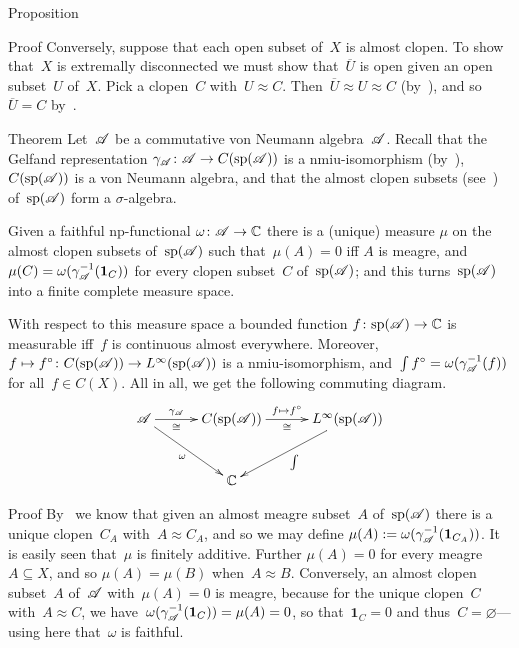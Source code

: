 \documentclass[a]{subfiles}
\begin{document}
\begin{parsec}
\begin{point}{Proposition}
\begin{point}{Proof}
Conversely,
suppose that each open subset of~$X$ is almost clopen.
To show that~$X$ is extremally disconnected
we must show that~$\overline{U}$ is open given
an open subset~$U$ of~$X$.
Pick a clopen~$C$ with~$U\approx C$.
Then~$\overline{U}\approx U\approx C$
(by~),
and so~$\overline{U}=C$ by~.


\end{point}
\end{point}
\begin{point}{Theorem}%
Let~$\mathscr{A}$ be a commutative von Neumann algebra~$\mathscr{A}$.
Recall that
the Gelfand representation $\gamma_{\mathscr{A}}\colon 
\mathscr{A}\to C(\mathrm{sp}(\mathscr{A}))$
is a nmiu-isomorphism (by~),
$C(\mathrm{sp}(\mathscr{A}))$ is a von Neumann algebra,
and that the almost clopen subsets (see~) of~$\mathrm{sp}(\mathscr{A})$
form a $\sigma$-algebra.

Given a faithful np-functional $\omega\colon \mathscr{A}\to\mathbb{C}$
there is a (unique) measure
$\mu$ on the almost clopen subsets of~$\mathrm{sp}(\mathscr{A})$
such that~$\mu(A)=0$ iff $A$ is meagre,
and~$\mu(C)=\omega(\gamma_{\mathscr{A}}^{-1} (\mathbf{1}_{C}))$
for every clopen subset~$C$ of~$\mathrm{sp}(\mathscr{A})$;
and this turns~$\mathrm{sp}(\mathscr{A})$
into a finite complete measure space.

With respect to this measure space a
bounded function $f\colon \mathrm{sp}(\mathscr{A})\to\mathbb{C}$
is measurable iff~$f$ is continuous almost everywhere.
Moreover, 
$f\mapsto f^\circ\colon C(\mathrm{sp}(\mathscr{A}))\to L^\infty(\mathrm{sp}(\mathscr{A}))$
is a nmiu-isomorphism,
and~$\int f^\circ = \omega(\gamma_{\mathscr{A}}^{-1}(f))$ for all~$f\in C(X)$.
All in all,
we get the following commuting diagram.
\begin{equation*}
\xymatrix@C=3em@R=3em{
\scrA
\ar[r]^-{\gamma_\scrA}_-\cong
\ar[rd]_\omega
&
C(\spec(\scrA))
\ar[r]^-{f\mapsto f^\circ}_-\cong
&
L^\infty(\spec(\scrA))
\ar[ld]^\int
\\
&
\C
}
\end{equation*}
\begin{point}{Proof}%
By~
we know that given an almost meagre subset~$A$
of~$\mathrm{sp}(\mathscr{A})$
there is a unique clopen~$C_A$
with~$A\approx C_A$,
and 
so we may define
$\mu(A):=\omega(\gamma_{\mathscr{A}}^{-1}(\mathbf{1}_{C_A}))$.
It is easily seen that~$\mu$
is finitely additive.
Further $\mu(A)=0$ for every meagre~$A\subseteq X$,
and so $\mu(A)=\mu(B)$ when~$A\approx B$.
Conversely, 
an almost clopen subset~$A$
of~$\mathscr{A}$
with~$\mu(A)=0$
is meagre,
because for the unique clopen~$C$ with~$A\approx C$,
we have~$\omega(\gamma_{\mathscr{A}}^{-1}(\mathbf{1}_C))=\mu(A)=0$,
so that~$\mathbf{1}_C=0$ and thus~$C=\varnothing$---using here
that~$\omega$ is faithful.


\end{point}
\end{point}
\end{parsec}
\end{document}
